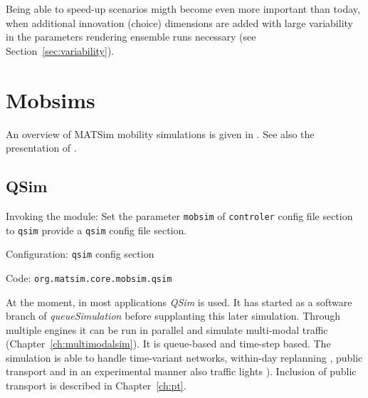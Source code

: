 Being able to speed-up scenarios migth become even more important than today, when additional innovation (choice) dimensions are added with large variability in the parameters rendering ensemble runs necessary (see Section~\ref{sec:variability}).

%





\section{Mobsims}
\label{sec:mobsims}
An overview of MATSim mobility simulations is given in \citet[][]{Dobler_TechRep_IVT_2011}. See also the presentation of \citet[][]{Rieser_unpub_IVT_2011}.

\subsection{QSim}
\label{sec:qsim}
\begin{compactitem}
\item Invoking the module: Set the parameter \lstinline|mobsim| of \lstinline|controler| config file section to \lstinline|qsim| provide a \lstinline|qsim| config file section.
\item Configuration: \lstinline|qsim| config section
\item Code: \lstinline|org.matsim.core.mobsim.qsim|
\end{compactitem}

At the moment, in most applications \emph{QSim} \citep[][]{Dobler_TechRep_IVT_2011, Dobler_STRC_2010} is used. It has started as a software branch of \emph{queueSimulation} before supplanting this later simulation. Through multiple engines it can be run in parallel and simulate multi-modal traffic (Chapter~\ref{ch:multimodalsim}). It is queue-based and time-step based. The simulation is able to handle time-variant networks, within-day replanning \citep[][]{Dobler_TechRep_IVT_2009}, public transport \citep[][]{Rieser_PhDThesis_2010} and in an experimental manner also traffic lights \citep[][]{Neumann_MastersThesis_2008}). Inclusion of public transport is described in Chapter~\ref{ch:pt}.


